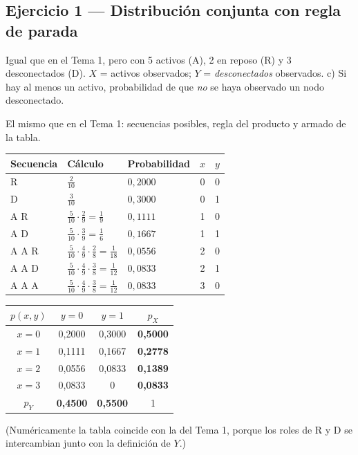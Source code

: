 \subsection{Ejercicio 1 --- Distribución conjunta con regla de parada}
\begin{enun}
Igual que en el Tema 1, pero con 5 activos (A), 2 en reposo (R) y 3 desconectados (D). $X$ = activos observados; $Y$ = \emph{desconectados} observados.
c) Si hay al menos un activo, probabilidad de que \emph{no} se haya observado un nodo desconectado.
\end{enun}
\begin{metodo}
El mismo que en el Tema 1: secuencias posibles, regla del producto y armado de la tabla.
\end{metodo}
\begin{center}
\renewcommand{\arraystretch}{1.25}
\begin{tabular}{@{}lllcc@{}}
\toprule
Secuencia & Cálculo & Probabilidad & $x$ & $y$\\\midrule
R & $\frac{2}{10}$ & $0{,}2000$ & 0 & 0\\
D & $\frac{3}{10}$ & $0{,}3000$ & 0 & 1\\
A R & $\frac{5}{10}\cdot\frac{2}{9}=\frac19$ & $0{,}1111$ & 1 & 0\\
A D & $\frac{5}{10}\cdot\frac{3}{9}=\frac16$ & $0{,}1667$ & 1 & 1\\
A A R & $\frac{5}{10}\cdot\frac{4}{9}\cdot\frac{2}{8}=\frac1{18}$ & $0{,}0556$ & 2 & 0\\
A A D & $\frac{5}{10}\cdot\frac{4}{9}\cdot\frac{3}{8}=\frac1{12}$ & $0{,}0833$ & 2 & 1\\
A A A & $\frac{5}{10}\cdot\frac{4}{9}\cdot\frac{3}{8}=\frac1{12}$ & $0{,}0833$ & 3 & 0\\\bottomrule
\end{tabular}
\qquad
\begin{tabular}{@{}c|cc|c@{}}
\toprule
$p(x,y)$ & $y=0$ & $y=1$ & $p_X$\\\midrule
$x=0$ & 0,2000 & 0,3000 & \textbf{0,5000}\\
$x=1$ & 0,1111 & 0,1667 & \textbf{0,2778}\\
$x=2$ & 0,0556 & 0,0833 & \textbf{0,1389}\\
$x=3$ & 0,0833 & 0 & \textbf{0,0833}\\\midrule
$p_Y$ & \textbf{0,4500} & \textbf{0,5500} & 1\\\bottomrule
\end{tabular}
\end{center}
(Numéricamente la tabla coincide con la del Tema 1, porque los roles de R y D se intercambian junto con la definición de $Y$.)

